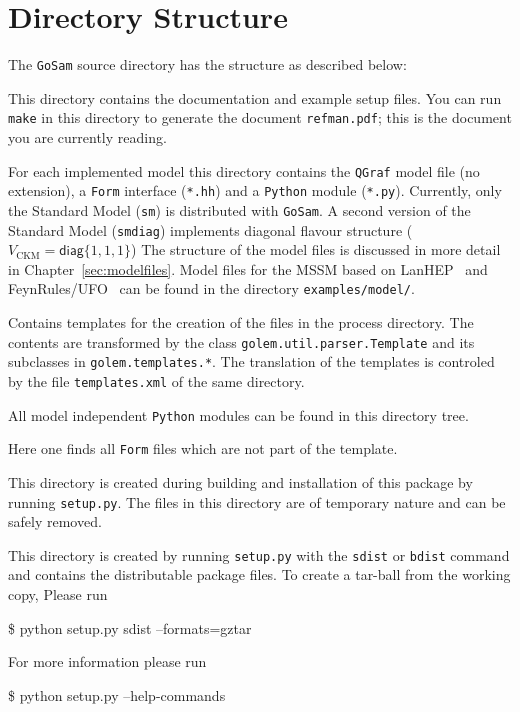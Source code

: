 \documentclass[11pt,a4paper]{refrep}
\newcommand{\golemversion}{{1{.}0}}
\newcommand{\golemv}[1][\golemversion]{{\tt GoSam}\xspace}
\newcommand{\qgraf}{{\tt QGraf}\xspace}
\newcommand{\form}{{\tt Form}\xspace}
\newcommand{\python}{{\tt Python}\xspace}
\begin{document}

\section{Directory Structure}
The \golemv{} source directory has the structure as described below:

 This directory contains the documentation
and example setup files. You can run \texttt{make} in this directory
to generate the document \texttt{refman.pdf}; this is the document you
are currently reading.

 For each implemented model this directory
contains the \qgraf model file (no extension), a \form interface
(\texttt{*.hh}) and a \python module (\texttt{*.py}). Currently,
only the Standard Model (\texttt{sm}) is distributed with \golemv.
A second version of the Standard Model (\texttt{smdiag}) implements
diagonal flavour structure ($V_{\text{CKM}}=\mathsf{diag}\{1,1,1\}$)
The structure of the model files is discussed in more detail in
Chapter~\ref{sec:modelfiles}. Model files for the MSSM based on 
LanHEP~\cite{Semenov:2010qt} and FeynRules/UFO~\cite{Degrande:2011ua}  
can be found in the directory 
\texttt{examples/model/}.

 Contains templates for the creation
of the files in the process directory. The contents are transformed
by the class \texttt{golem.util.parser.Template} and its subclasses
in \texttt{golem.templates.*}. The translation of the templates is
controled by the file \texttt{templates.xml} of the same directory.

 All model independent \python modules
can be found in this directory tree.

 Here one finds all \form files
which are not part of the template.

 This directory is created during
building and installation of this package by running \texttt{setup.py}.
The files in this directory are of temporary nature and can be safely
removed.

 This directory is created by running
\texttt{setup.py} with the \texttt{sdist} or \texttt{bdist} command
and contains the distributable package files.
To create a tar-ball from the working copy, Please run
\begin{example}
\$ python setup.py sdist --formats=gztar
\end{example}
For more information
please run
\begin{example}
\$ python setup.py --help-commands
\end{example}
\end{document}
